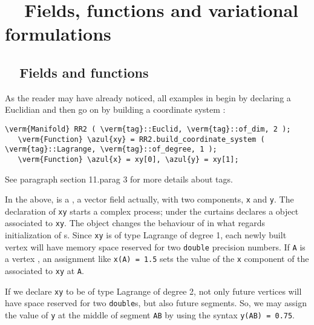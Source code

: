 
\chapter{~~Fields, functions and variational formulations}\label{\numb section 5}


\section{~~Fields and functions}\label{\numb section 5.\numb parag 1}

As the reader may have already noticed, all examples in {\maniFEM} begin by declaring a
Euclidian {\small\tt {}} and then go on by building a coordinate system :

\begin{Verbatim}[commandchars=\\\{\},formatcom=\small\tt,
   baselinestretch=0.94,framesep=2mm                     ]
   \verm{Manifold} RR2 ( \verm{tag}::Euclid, \verm{tag}::of_dim, 2 );
   \verm{Function} \azul{xy} = RR2.build_coordinate_system ( \verm{tag}::Lagrange, \verm{tag}::of_degree, 1 );
   \verm{Function} \azul{x} = xy[0], \azul{y} = xy[1];
\end{Verbatim}

See paragraph \numb section 11.\numb parag 3 for more details about tags.

In the above, {\small\tt {}} is a {\small\tt {}}, a vector field actually,
with two components, {\small\tt x} and {\small\tt y}.
The declaration of {\small\tt xy} starts a complex process; under the curtains
{\maniFEM} declares a {\small\tt {}} object associated to {\small\tt xy}.
The {\small\tt {}} object changes the behaviour of {\maniFEM} in what regards
initialization of {\small\tt {}}s.
Since {\small\tt xy} is of type Lagrange of degree 1, each newly built vertex
{\small\tt {}} will have memory space reserved for two {\small\tt double}
precision numbers.
If {\small\tt A} is a vertex {\small\tt {}}, an assignment like {\small\tt x(A) = 1.5}
sets the value of the {\small\tt x} component of the {\small\tt {}} associated to
{\small\tt xy} at {\small\tt A}.

If we declare {\small\tt xy} to be of type Lagrange of degree 2, not only future vertices will
have space reserved for two {\small\tt double}s, but also future segments.
So, we may assign the value of {\small\tt y} at the middle of segment {\small\tt AB} by using
the syntax {\small\tt y(AB) = 0.75}.

